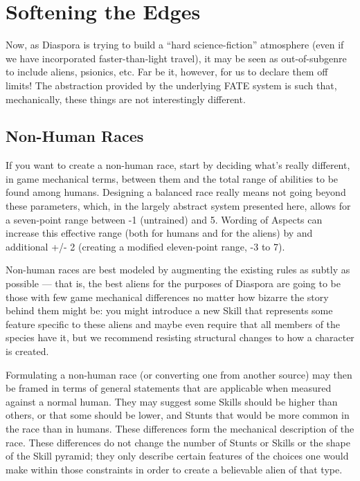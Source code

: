 \iflandscape{}{\vfil}
\section{Softening the Edges}\label{sec:Softening the Edges}

Now, as Diaspora is trying to build a ``hard science-fiction'' atmosphere (even if we have incorporated faster-than-light travel), it may be seen as out-of-subgenre to include aliens, psionics, etc. Far be it, however, for us to declare them off limits! The abstraction provided by the underlying FATE system is such that, mechanically, these things are not interestingly different.


\subsection{Non-Human Races}\label{sec:Non-Human Races}

If you want to create a non-human race, start by deciding what's really different, in game mechanical terms, between them and the total range of abilities to be found among humans. Designing a balanced race really means not going beyond these parameters, which, in the largely abstract system presented here, allows for a seven-point range between -1 (untrained) and 5. Wording of Aspects can increase this effective range (both for humans and for the aliens) by and additional +/- 2 (creating a modified eleven-point range, -3 to 7).

Non-human races are best modeled by augmenting the existing rules as subtly as possible --- that is, the best aliens for the purposes of Diaspora are going to be those with few game mechanical differences no matter how bizarre the story behind them might be: you might introduce a new Skill that represents some feature specific to these aliens and maybe even require that all members of the species have it, but we recommend resisting structural changes to how a character is created.

Formulating a non-human race (or converting one from another source) may then be framed in terms of general statements that are applicable when measured against a normal human. They may suggest some Skills should be higher than others, or that some should be lower, and Stunts that would be more common in the race than in humans. These differences form the mechanical description of the race. These differences do not change the number of Stunts or Skills or the shape of the Skill pyramid; they only describe certain features of the choices one would make within those constraints in order to create a believable alien of that type.

